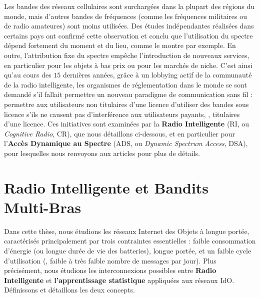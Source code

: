 \begin{resume_fr}
Les bandes des réseaux cellulaires sont surchargées dans la plupart des régions du monde, mais d'autres bandes de fréquences (comme les fréquences militaires ou de radio amateures) sont moins utilisées.
Des études indépendantes réalisées dans certains pays ont confirmé cette observation et conclu que l'utilisation du spectre dépend fortement du moment et du lieu, comme le montre \cite{Lopez2009spectral} par exemple.
En outre, l'attribution fixe du spectre empêche
l'introduction de nouveaux services, en particulier pour les objets à bas prix ou pour les marchés de niche.
%
C'est ainsi qu'au cours des $15$ dernières années, grâce à un lobbying actif de la communauté de la radio intelligente,
les organismes de réglementation dans le monde se sont demandé s'il fallait permettre un nouveau paradigme de communication sans fil :
permettre aux utilisateurs non titulaires d'une licence d'utiliser des bandes sous licence s'ils ne causent pas d'interférence aux utilisateurs payants, \ie, titulaires d'une licence.
Ces initiatives sont examinées par la \textbf{Radio Intelligente} (RI, ou \emph{Cognitive Radio}, CR),
que nous détaillons ci-dessous, et en particulier pour l'\textbf{Accès Dynamique au Spectre} (ADS, ou \emph{Dynamic Spectrum Access}, DSA),
pour lesquelles nous renvoyons aux articles \cite{akyildiz2006next,garhwal2012survey} pour plus de détails.



\section*{Radio Intelligente et Bandits Multi-Bras}

Dans cette thèse, nous étudions les réseaux Internet des Objets à longue portée, caractérisés principalement par trois contraintes essentielles :
faible consommation d'énergie (ou longue durée de vie des batteries),
longue portée,
et un faible cycle d'utilisation (\ie, faible à très faible nombre de messages par jour).
%
Plus précisément, nous étudions les interconnexions possibles entre \textbf{Radio Intelligente} et \textbf{l'apprentissage statistique} appliquées aux réseaux IdO.
Définissons et détaillons les deux concepts.



\end{resume_fr}
